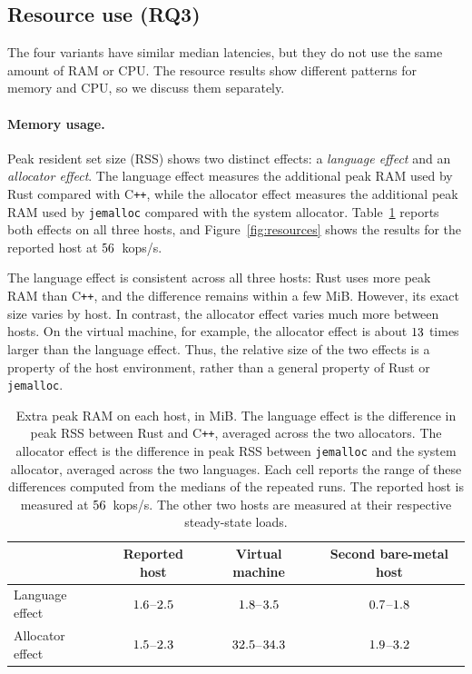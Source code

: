 \documentclass[english,oneside,a4paper,censored,csm,software-track-2020]{HYthesisML}
\begin{document}
\FloatBarrier
\subsection{Resource use (RQ3)}\label{sec:resources}
The four variants have similar median latencies, but they do not use the same
amount of RAM or CPU. The resource results show different patterns for
memory and CPU, so we discuss them separately.

\paragraph{Memory usage.}
Peak resident set size (RSS) shows two distinct effects: a
\emph{language effect} and an \emph{allocator effect}. The language effect
measures the additional peak RAM used by Rust compared with C\texttt{++},
while the allocator effect measures the additional peak RAM used by
\texttt{jemalloc} compared with the system allocator. Table~\ref{tab:rsshosts}
reports both effects on all three hosts, and Figure~\ref{fig:resources}
shows the results for the reported host at $56$~kops/s.

The language effect is consistent across all three hosts: Rust uses more
peak RAM than C\texttt{++}, and the difference remains within a few MiB.
However, its exact size varies by host. In contrast, the allocator effect
varies much more between hosts. On the virtual machine, for example, the
allocator effect is about $13$ times larger than the
language effect. Thus, the relative size of the two effects is a property
of the host environment, rather than a general property of Rust or
\texttt{jemalloc}.

\enlargethispage{24pt}
\begin{table}[!ht]
\centering
\small
\caption[Extra peak RAM on each host]{Extra peak RAM on each host, in MiB.
The language effect is the difference in peak RSS between Rust and
C\texttt{++}, averaged across the two allocators. The allocator effect is
the difference in peak RSS between \texttt{jemalloc} and the system
allocator, averaged across the two languages. Each cell reports the range
of these differences computed from the medians of the repeated runs. The
reported host is measured at $56$~kops/s. The other two hosts are
measured at their respective steady-state loads.\label{tab:rsshosts}}
\renewcommand{\arraystretch}{1.2}
\begin{tabular}{@{}lccc@{}}
\hline\hline
 & Reported host & Virtual machine & Second bare-metal host \\
\hline
Language effect & $1.6$--$2.5$
  & $1.8$--$3.5$ & $0.7$--$1.8$ \\
Allocator effect & $1.5$--$2.3$
  & $32.5$--$34.3$ & $1.9$--$3.2$ \\
\hline
\end{tabular}
\end{table}
\end{document}
